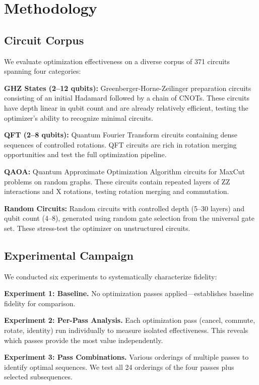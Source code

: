 \documentclass[journal]{IEEEtran}
\begin{document}
\section{Methodology}
\label{sec:methodology}

\subsection{Circuit Corpus}

We evaluate optimization effectiveness on a diverse corpus of 371 circuits spanning four categories:

\textbf{GHZ States (2--12 qubits):} Greenberger-Horne-Zeilinger preparation circuits consisting of an initial Hadamard followed by a chain of CNOTs. These circuits have depth linear in qubit count and are already relatively efficient, testing the optimizer's ability to recognize minimal circuits.

\textbf{QFT (2--8 qubits):} Quantum Fourier Transform circuits containing dense sequences of controlled rotations. QFT circuits are rich in rotation merging opportunities and test the full optimization pipeline.

\textbf{QAOA:} Quantum Approximate Optimization Algorithm circuits for MaxCut problems on random graphs. These circuits contain repeated layers of ZZ interactions and X rotations, testing rotation merging and commutation.

\textbf{Random Circuits:} Random circuits with controlled depth (5--30 layers) and qubit count (4--8), generated using random gate selection from the universal gate set. These stress-test the optimizer on unstructured circuits.

\subsection{Experimental Campaign}

We conducted six experiments to systematically characterize fidelity:

\textbf{Experiment 1: Baseline.} No optimization passes applied---establishes baseline fidelity for comparison.

\textbf{Experiment 2: Per-Pass Analysis.} Each optimization pass (cancel, commute, rotate, identity) run individually to measure isolated effectiveness. This reveals which passes provide the most value independently.

\textbf{Experiment 3: Pass Combinations.} Various orderings of multiple passes to identify optimal sequences. We test all 24 orderings of the four passes plus selected subsequences.
\end{document}
